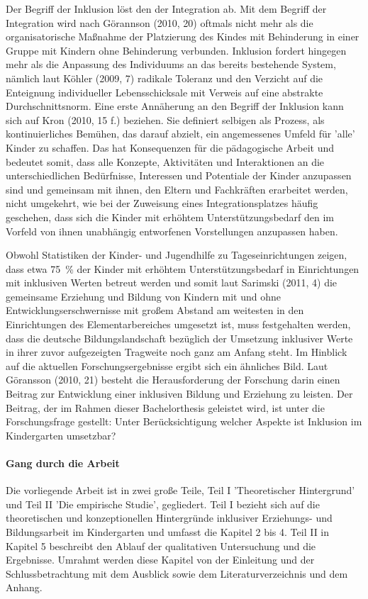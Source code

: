Der Begriff der Inklusion löst den der Integration ab. Mit dem Begriff der Integration wird nach Görannson (2010, 20) oftmals nicht mehr als die organisatorische Maßnahme der Platzierung des Kindes mit Behinderung in einer Gruppe mit Kindern ohne Behinderung verbunden. Inklusion fordert hingegen mehr als die Anpassung des Individuums an das bereits bestehende System, nämlich laut Köhler (2009, 7) radikale Toleranz und den Verzicht auf die Enteignung individueller Lebensschicksale mit Verweis auf eine abstrakte Durchschnittsnorm. Eine erste Annäherung an den Begriff der Inklusion kann sich auf Kron (2010, 15 f.) beziehen. Sie definiert selbigen als Prozess, als kontinuierliches Bemühen, das darauf abzielt, ein angemessenes Umfeld für ’alle’ Kinder zu schaffen. Das hat Konsequenzen für die pädagogische Arbeit und bedeutet somit, dass alle Konzepte, Aktivitäten und Interaktionen an die unterschiedlichen Bedürfnisse, Interessen und Potentiale der Kinder anzupassen sind und gemeinsam mit ihnen, den Eltern und Fachkräften erarbeitet werden, nicht umgekehrt, wie bei der Zuweisung eines Integrationsplatzes häufig geschehen, dass sich die Kinder mit erhöhtem Unterstützungsbedarf den im Vorfeld von ihnen unabhängig entworfenen Vorstellungen anzupassen haben.  

Obwohl Statistiken der Kinder- und Jugendhilfe zu Tageseinrichtungen zeigen, dass etwa 75~\% der Kinder mit erhöhtem Unterstützungsbedarf in Einrichtungen mit inklusiven Werten betreut werden und somit laut Sarimski (2011, 4) die gemeinsame Erziehung und Bildung von Kindern mit und ohne Entwicklungserschwernisse mit großem Abstand am weitesten in den Einrichtungen des Elementarbereiches umgesetzt ist, muss festgehalten werden, dass die deutsche Bildungslandschaft bezüglich der Umsetzung inklusiver Werte in ihrer zuvor aufgezeigten Tragweite noch ganz am Anfang steht. Im Hinblick auf die aktuellen Forschungsergebnisse ergibt sich ein ähnliches Bild. Laut Göransson (2010, 21) besteht die Herausforderung der Forschung darin einen Beitrag zur Entwicklung einer inklusiven Bildung und Erziehung zu leisten. Der Beitrag, der im Rahmen dieser Bachelorthesis geleistet wird, ist unter die Forschungsfrage gestellt: Unter Berücksichtigung welcher Aspekte ist Inklusion im Kindergarten umsetzbar?

\paragraph{Gang durch die Arbeit} 
Die vorliegende Arbeit ist in zwei große Teile, Teil I 'Theoretischer Hintergrund' und Teil II 'Die empirische Studie', gegliedert. Teil I bezieht sich auf die theoretischen und konzeptionellen Hintergründe inklusiver Erziehungs- und Bildungsarbeit im Kindergarten und umfasst die Kapitel 2 bis 4. Teil II in Kapitel 5 beschreibt den Ablauf der qualitativen Untersuchung und die Ergebnisse. Umrahmt werden diese Kapitel von der Einleitung und der Schlussbetrachtung mit dem Ausblick sowie dem Literaturverzeichnis und dem Anhang.

